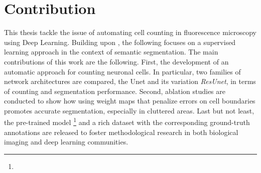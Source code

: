 \section{Contribution}
\label{sec:contribution}
This thesis tackle the issue of automating cell counting in fluorescence microscopy using Deep Learning. 
Building upon , the following focuses on a supervised learning approach in the context of semantic segmentation.
The main contributions of this work are the following. 
First, the development of an automatic approach for counting neuronal cells. 
In particular, two families of network architectures are compared, the {Unet} and its variation \textit{ResUnet}, in terms of counting and segmentation performance. 
Second, ablation studies are conducted to show how using weight maps that penalize errors on cell boundaries promotes accurate segmentation, especially in cluttered areas.
Last but not least, the pre-trained model%
\footnote{\linkmodel}
and a rich dataset with the corresponding ground-truth annotations \cite{clissa2021fluocells} are released to foster methodological research in both biological imaging and deep learning communities.